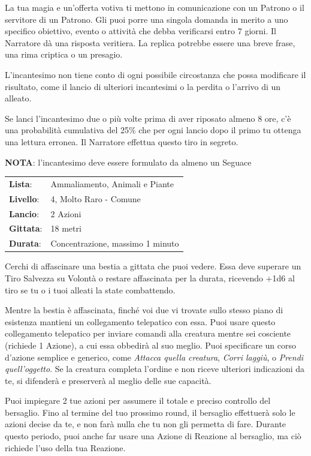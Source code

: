 \begin{multicols}{2}
La tua magia e un'offerta votiva ti mettono in comunicazione con un Patrono o il servitore di un Patrono. Gli puoi porre una singola domanda in merito a uno specifico obiettivo, evento o attività che debba verificarsi entro 7 giorni. Il Narratore dà una risposta veritiera. La replica potrebbe essere una breve frase, una rima criptica o un presagio.

L'incantesimo non tiene conto di ogni possibile circostanza che possa modificare il risultato, come il lancio di ulteriori incantesimi o la perdita o l'arrivo di un alleato.

Se lanci l'incantesimo due o più volte prima di aver riposato almeno 8 ore, c'è una probabilità cumulativa del 25\% che per ogni lancio dopo il primo tu ottenga una lettura erronea. Il Narratore effettua questo tiro in segreto.

\textbf{NOTA}: l'incantesimo deve essere formulato da almeno un Seguace

\noindent\begin{tabularx}{\linewidth}{p{1.3cm}X}
	\rowcolor{gray!20}\textbf{Lista}: & Ammaliamento, Animali e Piante \\
	\textbf{Livello}: & 4, Molto Raro - Comune \\
	\rowcolor{gray!20}\textbf{Lancio}: & 2 Azioni \\
	\textbf{Gittata}: & 18 metri \\
	\rowcolor{gray!20}\textbf{Durata}: & Concentrazione, massimo 1 minuto \\
\end{tabularx}\smallskip

Cerchi di affascinare una bestia a gittata che puoi vedere. Essa deve superare un Tiro Salvezza su Volontà o restare affascinata per la durata, ricevendo +1d6 al tiro se tu o i tuoi alleati la state combattendo.

Mentre la bestia è affascinata, finché voi due vi trovate sullo stesso piano di esistenza mantieni un collegamento telepatico con essa. Puoi usare questo collegamento telepatico per inviare comandi alla creatura mentre sei cosciente (richiede 1 Azione), a cui essa obbedirà al suo meglio. Puoi specificare un corso d'azione semplice e generico, come \emph{Attacca quella creatura}, \emph{Corri laggiù}, o \emph{Prendi quell'oggetto}. Se la creatura completa l'ordine e non riceve ulteriori indicazioni da te, si difenderà e preserverà al meglio delle sue capacità.

Puoi impiegare 2 tue azioni per assumere il totale e preciso controllo del bersaglio. Fino al termine del tuo prossimo round, il bersaglio effettuerà solo le azioni decise da te, e non farà nulla che tu non gli permetta di fare. Durante questo periodo, puoi anche far usare una Azione di Reazione al bersaglio, ma ciò richiede l'uso della tua Reazione.


\end{multicols}
